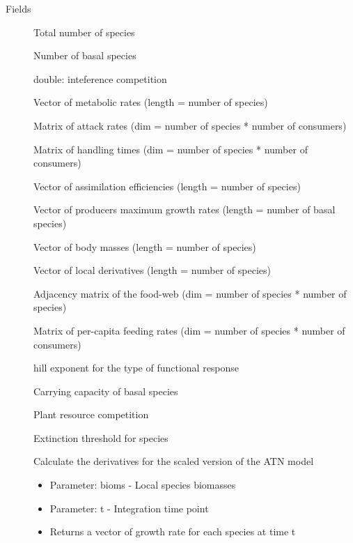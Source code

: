 \documentclass[letterpaper]{book}
\begin{document}
\begin{Section}{Fields}

\begin{description}

\item[] Total number of species

\item[] Number of basal species

\item[] double: inteference competition

\item[] Vector of metabolic rates (length = number of species)

\item[] Matrix of attack rates (dim = number of species * number of consumers)

\item[] Matrix of handling times (dim = number of species * number of consumers)

\item[] Vector of assimilation efficiencies (length = number of species)

\item[] Vector of producers maximum growth rates (length = number of basal species)

\item[] Vector of body masses (length = number of species)

\item[] Vector of local derivatives (length = number of species)

\item[] Adjacency matrix of the food-web (dim = number of species * number of species)

\item[] Matrix of per-capita feeding rates (dim = number of species * number of consumers)

\item[] hill exponent for the type of functional response

\item[] Carrying capacity of basal species

\item[] Plant resource competition

\item[] Extinction threshold for species

\item[] Calculate the derivatives for the scaled version of the ATN model \begin{itemize}

\item{} Parameter: bioms -  Local species biomasses
\item{} Parameter: t - Integration time point
\item{} Returns a vector of growth rate for each species at time t

\end{itemize}


\end{description}
\end{Section}
\end{document}
